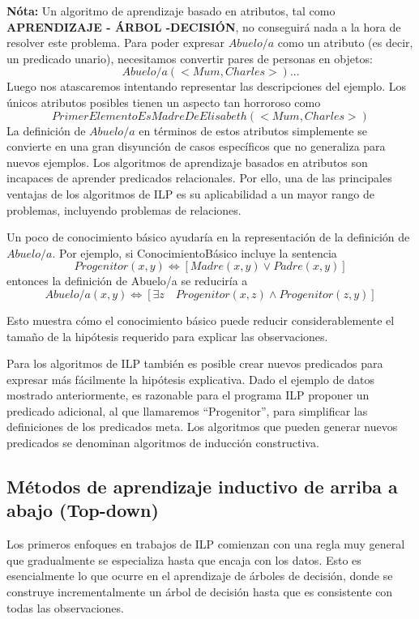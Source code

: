 \documentclass[12 pt, a4paper]{article}
\begin{document}
			\textbf{Nóta:} Un algoritmo de aprendizaje basado en atributos, tal como \textbf{APRENDIZAJE - ÁRBOL -DECISIÓN}, no conseguirá nada a la hora de resolver este problema. Para poder expresar $Abuelo/a$ como un atributo (es decir, un predicado unario), necesitamos convertir pares de personas en objetos:
				$$Abuelo/a(<Mum, Charles>) ...$$
			Luego nos atascaremos intentando representar las descripciones del ejemplo. Los únicos atributos posibles tienen un aspecto tan horroroso como
				$$PrimerElementoEsMadreDeElisabeth(<Mum, Charles>)$$
			La definición de $Abuelo/a$ en términos de estos atributos simplemente se convierte en una gran disyunción de casos específicos que no generaliza para nuevos ejemplos. 
Los algoritmos de aprendizaje basados en atributos son incapaces de aprender predicados relacionales. 
Por ello, una de las principales ventajas de los algoritmos de ILP es su aplicabilidad a un mayor rango de problemas, incluyendo problemas de relaciones.

			Un poco de conocimiento básico ayudaría en la representación de la definición de $Abuelo/a$. Por ejemplo, si ConocimientoBásico incluye la sentencia
				$$Progenitor(x,y) \Leftrightarrow [Madre(x , y) \lor Padre(x, y)]$$
			entonces la definición de Abuelo/a se reduciría a
				$$Abuelo/a(x, y)\Leftrightarrow [\exists z \quad Progenitor(x, z) \land Progenitor(z, y)]$$
			
			Esto muestra cómo el conocimiento básico puede reducir considerablemente el tamaño de la hipótesis requerido para explicar las observaciones.

			Para los algoritmos de ILP también es posible crear nuevos predicados para expresar más fácilmente la hipótesis explicativa. Dado el ejemplo de datos mostrado anteriormente, es razonable para el programa ILP proponer un predicado adicional, al que llamaremos ``Progenitor'', para simplificar las definiciones de los predicados meta. Los algoritmos que pueden generar nuevos predicados se denominan algoritmos de inducción constructiva. 
			\subsection{Métodos de aprendizaje inductivo de arriba a abajo (Top-down)}
				Los primeros enfoques en trabajos de ILP comienzan con una regla muy general que gradualmente se especializa hasta que encaja con los datos. Esto es esencialmente lo que ocurre en el aprendizaje de árboles de decisión, donde se construye incrementalmente un árbol de decisión hasta que es consistente con todas las observaciones. 
\end{document}
